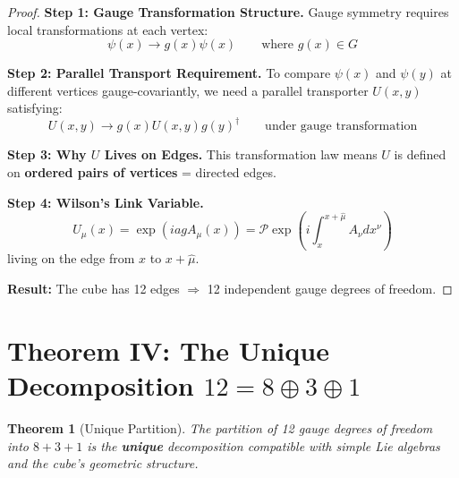 \documentclass[11pt,a4paper]{article}
\theoremstyle{plain}
\newtheorem{theorem}{Theorem}[section]
\theoremstyle{definition}
\theoremstyle{remark}
\begin{document}
\begin{proof}
\textbf{Step 1: Gauge Transformation Structure.} Gauge symmetry requires local transformations at each vertex:
\[
\psi(x) \to g(x)\psi(x) \qquad \text{where } g(x) \in G
\]

\textbf{Step 2: Parallel Transport Requirement.} To compare $\psi(x)$ and $\psi(y)$ at different vertices gauge-covariantly, we need a parallel transporter $U(x,y)$ satisfying:
\[
U(x,y) \to g(x) U(x,y) g(y)^\dagger \qquad \text{under gauge transformation}
\]

\textbf{Step 3: Why $U$ Lives on Edges.} This transformation law means $U$ is defined on \textbf{ordered pairs of vertices} = directed edges.

\textbf{Step 4: Wilson's Link Variable.}
\[
U_\mu(x) = \exp\left(iagA_\mu(x)\right) = \mathcal{P}\exp\left(i\int_x^{x+\hat{\mu}} A_\nu dx^\nu\right)
\]
living on the edge from $x$ to $x + \hat{\mu}$.

\textbf{Result:} The cube has 12 edges $\Rightarrow$ 12 independent gauge degrees of freedom.
\end{proof}

\section{Theorem IV: The Unique Decomposition $12 = 8 \oplus 3 \oplus 1$}

\begin{theorem}[Unique Partition]
The partition of 12 gauge degrees of freedom into $8 + 3 + 1$ is the \textbf{unique} decomposition compatible with simple Lie algebras and the cube's geometric structure.
\end{theorem}
\end{document}
